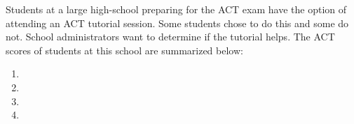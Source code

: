 Students at a large high-school preparing for the ACT exam have the option of attending
an ACT tutorial session. Some students chose to do this and some do not. School
administrators want to determine if the tutorial helps. The ACT scores of students at
this school are summarized below:
\begin{enumerate}[label={(\alph*)}]
    \item \vspace{.2in}
    \item \vspace{.2in}
    \item \vspace{0.2in}
    \item 
\end{enumerate}